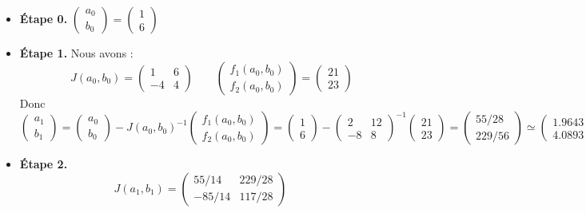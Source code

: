 \documentclass[class=report,crop=false]{standalone}
\begin{document}
\begin{exemple}
\begin{itemize}
  \item \textbf{\'Etape 0.} $\begin{pmatrix}a_0\\b_0\end{pmatrix}=\begin{pmatrix}1\\6\end{pmatrix}$
  \item \textbf{\'Etape 1.} Nous avons :
  $$J(a_0,b_0) = \begin{pmatrix}1&6\\-4&4\end{pmatrix}\qquad
  \begin{pmatrix}f_1(a_0,b_0)\\f_2(a_0,b_0)\end{pmatrix}=\begin{pmatrix}21\\23\end{pmatrix}$$
  Donc
  $$\begin{pmatrix}a_{1}\\b_{1}\end{pmatrix} = \begin{pmatrix}a_0\\b_0\end{pmatrix}-J(a_0,b_0)^{-1}\begin{pmatrix}f_1(a_0,b_0)\\f_2(a_0,b_0)\end{pmatrix}
  = \begin{pmatrix}1\\6\end{pmatrix} - \begin{pmatrix}2&12\\-8&8\end{pmatrix}^{-1} \begin{pmatrix}21\\23\end{pmatrix}
  = \begin{pmatrix}55/28\\229/56\end{pmatrix}
  \simeq \begin{pmatrix} \num{1.9643}\\\num{4.0893}\end{pmatrix}$$
  \item \textbf{\'Etape 2.} 
  $$J(a_1,b_1) = \begin{pmatrix}55/14&229/28\\-85/14& 117/28\end{pmatrix}\qquad
$$
\end{itemize}
\end{exemple}
\end{document}
